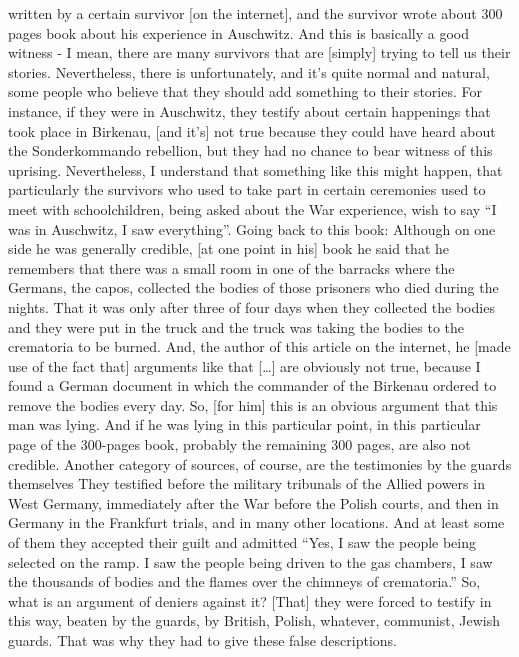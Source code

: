 written by a certain survivor [on the internet], and the survivor wrote about 300 pages book about his experience in Auschwitz. And this is basically a good witness - I mean, there are many survivors that are [simply] trying to tell us their stories. Nevertheless, there is unfortunately, and it's quite normal and natural, some people who believe that they should add something to their stories. For instance, if they were in Auschwitz, they testify about certain happenings that took place in Birkenau, [and it’s] not true because they could have heard about the Sonderkommando rebellion, but they had no chance to bear witness of this uprising. Nevertheless, I understand that something like this might happen, that particularly the survivors who used to take part in certain ceremonies used to meet with schoolchildren, being asked about the War experience, wish to say “I was in Auschwitz, I saw everything”. Going back to this book: Although on one side he was generally credible, [at one point in his] book he said that he remembers that there was a small room in one of the barracks where the Germans, the capos, collected the bodies of those prisoners who died during the nights. That it was only after three of four days when they collected the bodies and they were put in the truck and the truck was taking the bodies to the crematoria to be burned. And, the author of this article on the internet, he [made use of the fact that] arguments like that […] are obviously not true, because I found a German document in which the commander of the Birkenau ordered to remove the bodies every day. So, [for him] this is an obvious argument that this man was lying. And if he was lying in this particular point, in this particular page of the 300-pages book, probably the remaining 300 pages, are also not credible. 
Another category of sources, of course, are the testimonies by the guards themselves They testified before the military tribunals of the Allied powers in West Germany, immediately after the War before the Polish courts, and then in Germany in the Frankfurt trials, and in many other locations. And at least some of them they accepted their guilt and admitted “Yes, I saw the people being selected on the ramp. I saw the people being driven to the gas chambers, I saw the thousands of bodies and the flames over the chimneys of crematoria.” So, what is an argument of deniers against it? [That] they were forced to testify in this way, beaten by the guards, by British, Polish, whatever, communist, Jewish guards. That was why they had to give these false descriptions. 
